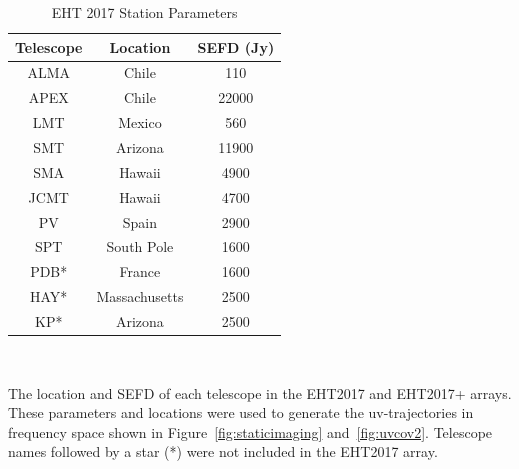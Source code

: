 \begin{table}[!t]
	\begin{center}
		\caption{EHT 2017 Station Parameters}
		\label{tab::eht_station}
		\begin{tabular}{ccc}
 Telescope & Location & SEFD (Jy) \\ \hline
 ALMA & Chile & 110 \\ 
 APEX & Chile & 22000 \\ 
 LMT & Mexico & 560 \\
 SMT & Arizona & 11900 \\ 
 SMA & Hawaii & 4900 \\
 JCMT & Hawaii & 4700 \\ 
 PV & Spain & 2900 \\ 
 SPT & South Pole & 1600 \\ \hline
 PDB* & France & 1600 \\ 
 HAY* & Massachusetts & 2500 \\ 
 KP* & Arizona & 2500 \\ \hline
		\end{tabular}\\
	\end{center}
	\bigskip
	\footnotesize{The location and SEFD of each telescope in the EHT2017 and EHT2017+ arrays. These parameters and locations were used to generate the uv-trajectories in frequency space shown in Figure~\ref{fig:staticimaging} and~\ref{fig:uvcov2}. Telescope names followed by a star (*) were not included in the EHT2017 array.}
	\label{tab:telescopes}
	\vspace{-0.3in}
\end{table}




